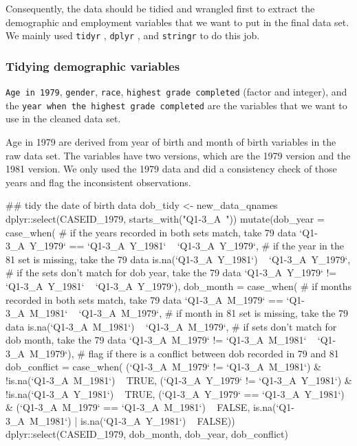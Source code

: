 Consequently, the data should be tidied and wrangled first to extract
the demographic and employment variables that we want to put in the
final data set. We mainly used \texttt{tidyr} \citep{tidyr},
\texttt{dplyr} \citep{dplyr}, and \texttt{stringr} \citep{stringr} to do
this job.

\hypertarget{tidying-demographic-variables}{%
\subsubsection{Tidying demographic
variables}\label{tidying-demographic-variables}}

\texttt{Age\ in\ 1979}, \texttt{gender}, \texttt{race},
\texttt{highest\ grade\ completed} (factor and integer), and the
\texttt{year\ when\ the\ highest\ grade\ completed} are the variables
that we want to use in the cleaned data set.

Age in 1979 are derived from year of birth and month of birth variables
in the raw data set. The variables have two versions, which are the 1979
version and the 1981 version. We only used the 1979 data and did a
consistency check of those years and flag the inconsistent observations.

\begin{Schunk}
\begin{Sinput}
## tidy the date of birth data
dob_tidy <- new_data_qnames %
  dplyr::select(CASEID_1979,
         starts_with("Q1-3_A~")) %
  mutate(dob_year = case_when(
                    # if the years recorded in both sets match, take 79 data
                    `Q1-3_A~Y_1979` == `Q1-3_A~Y_1981` ~ `Q1-3_A~Y_1979`,
                    # if the year in the 81 set is missing, take the 79 data
                    is.na(`Q1-3_A~Y_1981`) ~ `Q1-3_A~Y_1979`,
                    # if the sets don't match for dob year, take the 79 data
                    `Q1-3_A~Y_1979` != `Q1-3_A~Y_1981` ~ `Q1-3_A~Y_1979`),
        dob_month = case_when(
                    # if months recorded in both sets match, take 79 data
                    `Q1-3_A~M_1979` == `Q1-3_A~M_1981` ~ `Q1-3_A~M_1979`,
                    # if month in 81 set is missing, take the 79 data
                    is.na(`Q1-3_A~M_1981`) ~ `Q1-3_A~M_1979`,
                    # if sets don't match for dob month, take the 79 data
                    `Q1-3_A~M_1979` != `Q1-3_A~M_1981` ~ `Q1-3_A~M_1979`),
        # flag if there is a conflict between dob recorded in 79 and 81
        dob_conflict = case_when(     
                      (`Q1-3_A~M_1979` != `Q1-3_A~M_1981`) & !is.na(`Q1-3_A~M_1981`)
                      ~ TRUE,
                      (`Q1-3_A~Y_1979` != `Q1-3_A~Y_1981`) & !is.na(`Q1-3_A~Y_1981`)
                      ~ TRUE,
                      (`Q1-3_A~Y_1979` == `Q1-3_A~Y_1981`) & 
                      (`Q1-3_A~M_1979` == `Q1-3_A~M_1981`) ~ FALSE,
                      is.na(`Q1-3_A~M_1981`) | is.na(`Q1-3_A~Y_1981`) ~ FALSE)) %
  dplyr::select(CASEID_1979,
         dob_month,
         dob_year,
         dob_conflict)
\end{Sinput}
\end{Schunk}

